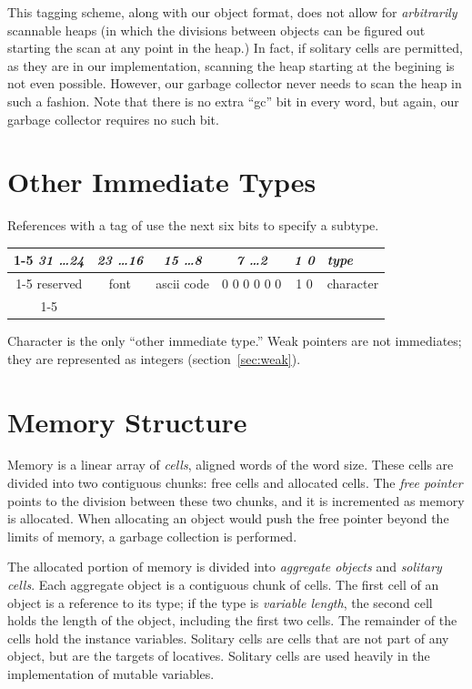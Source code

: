 This tagging scheme, along with our object format, does not allow for
\emph{arbitrarily} scannable heaps (in which the divisions between
objects can be figured out starting the scan at any point in the
heap.)  In fact, if solitary cells are permitted, as they are in our
implementation, scanning the heap starting at the begining is not even
possible.  However, our garbage collector never needs to scan the heap
in such a fashion.  Note that there is no extra ``gc'' bit in every
word, but again, our garbage collector requires no such bit.


\section{Other Immediate Types}

References with a tag of   use the next six bits to
specify a subtype.
\begin{center}
\begin{tabular}{|c|c|c|c|c|l}
\cline{1-5}
\emph{31 \ldots 24} & \emph{23 \ldots 16} & \emph{15 \ldots 8} &
\emph{7 \ldots 2} & \emph{1 0} & \multicolumn{1}{l}{\emph{type}} \\ \cline{1-5}
 reserved & font & ascii code & 0 0 0 0 0 0 & 1 0 & character\\ \cline{1-5}
\end{tabular}
\end{center}
Character is the only ``other immediate type.''  Weak pointers are
not immediates; they are represented as integers
(section~\ref{sec:weak}).


\section{Memory Structure}

Memory is a linear array of \emph{cells}, aligned words of the word
size.  These
cells are divided into two contiguous chunks: free cells and allocated
cells.  The \emph{free pointer} points to the division between these
two chunks, and it is incremented as memory is allocated.  When
allocating an object would push the free pointer beyond the limits of
memory, a garbage collection is performed.

The allocated portion of memory is divided into \emph{aggregate
objects} and \emph{solitary cells}.  Each aggregate object is a
contiguous chunk of cells.  The first cell of an object is a reference
to its type; if the type is \emph{variable length}, the second cell
holds the length of the object, including the first two cells.  The
remainder of the cells hold the instance variables.  Solitary cells
are cells that are not part of any object, but are the targets of
locatives.  Solitary cells are used heavily in the implementation of
mutable variables.

